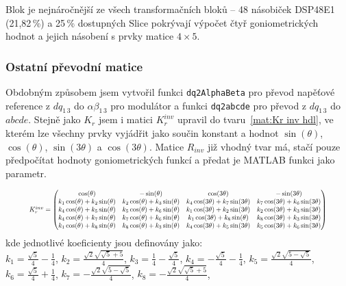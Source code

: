Blok je nejnáročnější ze všech transformačních bloků -- 48 násobiček DSP48E1 (21{,}82\,\%) a 25\,\% dostupných Slice pokrývají výpočet čtyř goniometrických hodnot a jejich násobení s prvky matice $4\times5$.

\subsubsection{Ostatní převodní matice}

Obdobným způsobem jsem vytvořil funkci \texttt{dq2AlphaBeta} pro převod napěťové reference z $dq_{1\,3}$ do $\alpha \beta_{1\,3}$ pro modulátor a funkci \texttt{dq2abcde} pro převod z $dq_{1\,3}$ do $abcde$.
Stejně jako $K_r$ jsem i matici $K_r^{inv}$ upravil do tvaru~\ref{mat:Kr inv hdl}, ve kterém lze všechny prvky vyjádřit jako součin konstant a hodnot $\sin(\theta)$, $\cos(\theta)$, $\sin(3\theta)$ a $\cos(3\theta)$. Matice $R_{inv}$ již vhodný tvar má, stačí pouze předpočítat hodnoty goniometrických funkcí a předat je MATLAB funkci jako parametr.

\begin{equation}
    \label{mat:Kr inv hdl}
    \resizebox{0.9\textwidth}{!}{$
    K_r^{inv} = \begin{pmatrix}
\cos(\theta) & -\sin(\theta) & \cos(3\theta) & -\sin(3\theta) \\
k_1 \cos(\theta) + k_2 \sin(\theta) & k_2 \cos(\theta) + k_3 \sin(\theta) & k_4 \cos(3\theta) + k_7 \sin(3\theta) & k_7 \cos(3\theta) + k_6 \sin(3\theta) \\
k_4 \cos(\theta) + k_5 \sin(\theta) & k_5 \cos(\theta) + k_6 \sin(\theta) & k_1 \cos(3\theta) + k_2 \sin(3\theta) & k_2 \cos(3\theta) + k_3 \sin(3\theta) \\
k_4 \cos(\theta) + k_7 \sin(\theta) & k_7 \cos(\theta) + k_6 \sin(\theta) & k_1 \cos(3\theta) + k_8 \sin(\theta) & k_8 \cos(3\theta) + k_3 \sin(3\theta) \\
k_1 \cos(\theta) + k_8 \sin(\theta) & k_8 \cos(\theta) + k_3 \sin(\theta) & k_4 \cos(3\theta) + k_5 \sin(3\theta) & k_5 \cos(3\theta) + k_6 \sin(3\theta)
\end{pmatrix}$}
\end{equation}
\noindent kde jednotlivé koeficienty jsou definovány jako: \\ 
\noindent $
k_1 = \frac{\sqrt{5}}{4} - \frac{1}{4} $, 
$k_2 = \frac{\sqrt{2} \sqrt{\sqrt{5}+5}}{4} $,
$k_3 = \frac{1}{4} - \frac{\sqrt{5}}{4} $,
$k_4 = -\frac{\sqrt{5}}{4} - \frac{1}{4} $,
$k_5 = \frac{\sqrt{2} \sqrt{5-\sqrt{5}}}{4} $,
$k_6 = \frac{\sqrt{5}}{4} + \frac{1}{4} $,
$k_7 = -\frac{\sqrt{2} \sqrt{5-\sqrt{5}}}{4} $,
$k_8 = -\frac{\sqrt{2} \sqrt{\sqrt{5}+5}}{4}$,

